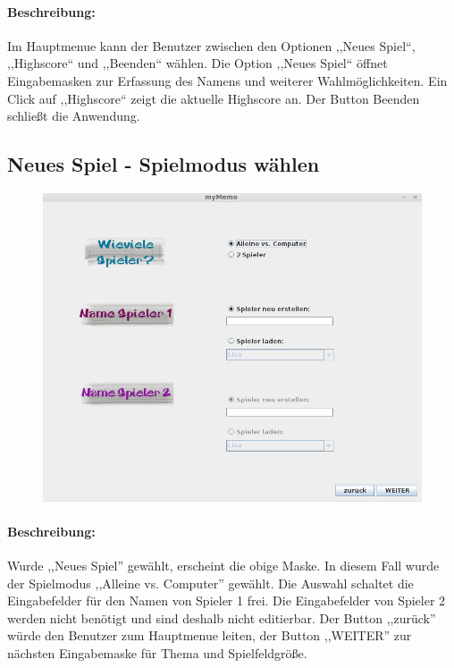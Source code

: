 \paragraph{Beschreibung: } Im Hauptmenue kann der Benutzer zwischen den Optionen ,,Neues Spiel``, ,,Highscore`` und ,,Beenden`` wählen. Die Option ,,Neues Spiel`` öffnet Eingabemasken zur Erfassung des Namens und weiterer Wahlmöglichkeiten. Ein Click auf ,,Highscore`` zeigt die aktuelle Highscore an. Der Button Beenden schließt die Anwendung.  


\clearpage
\subsection{Neues Spiel - Spielmodus wählen}
\begin{figure}[!h]
	\centering
    \includegraphics[width=\textwidth]{./guiSpieler.png}
	\label{}
\end{figure}
\paragraph{Beschreibung: }Wurde ,,Neues Spiel'' gewählt, erscheint die obige Maske. In diesem Fall wurde der Spielmodus ,,Alleine vs. Computer'' gewählt. Die Auswahl schaltet die Eingabefelder für den Namen von Spieler 1 frei. Die Eingabefelder von Spieler 2 werden nicht benötigt und sind deshalb nicht editierbar. Der Button ,,zurück'' würde den Benutzer zum Hauptmenue leiten, der Button ,,WEITER'' zur nächsten Eingabemaske für Thema und Spielfeldgröße.

